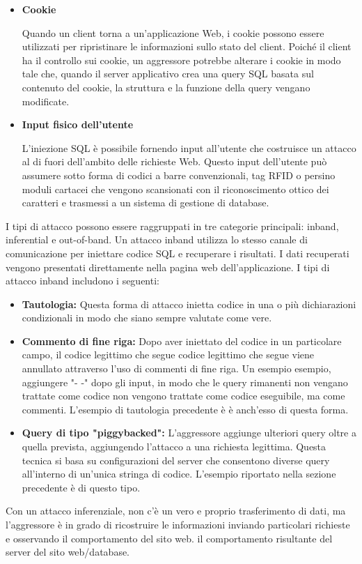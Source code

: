 \begin{itemize}
    \item \textbf{Cookie}
    
    Quando un client torna a un'applicazione Web, i cookie possono essere utilizzati per ripristinare le informazioni sullo stato del client. Poiché il client ha il controllo sui cookie, un aggressore potrebbe alterare i cookie in modo tale che, quando il server applicativo crea una query SQL basata sul contenuto del cookie, la struttura e la funzione della query vengano modificate.
    
    \item \textbf{Input fisico dell'utente}
    
    L'iniezione SQL è possibile fornendo input all'utente che costruisce un attacco al di fuori dell'ambito delle richieste Web. Questo input dell'utente può assumere sotto forma di codici a barre convenzionali, tag RFID o persino moduli cartacei che vengono scansionati con il riconoscimento ottico dei caratteri e trasmessi a un sistema di gestione di database.
\end{itemize}
I tipi di attacco possono essere raggruppati in tre categorie principali: inband, inferential e out-of-band. Un attacco inband utilizza lo stesso canale di comunicazione per iniettare codice SQL e recuperare i risultati. I dati recuperati vengono presentati direttamente nella pagina web dell'applicazione. I tipi di attacco inband includono i seguenti:
\begin{itemize}
    \item \textbf{Tautologia:} Questa forma di attacco inietta codice in una o più dichiarazioni condizionali in modo che siano sempre valutate come vere. 
    
    \item \textbf{Commento di fine riga:} Dopo aver iniettato del codice in un particolare campo, il codice legittimo che segue codice legittimo che segue viene annullato attraverso l'uso di commenti di fine riga. Un esempio esempio, aggiungere "- -" dopo gli input, in modo che le query rimanenti non vengano trattate come codice non vengono trattate come codice eseguibile, ma come commenti. L'esempio di tautologia precedente è è anch'esso di questa forma.
    
    \item \textbf{Query di tipo "piggybacked":} L'aggressore aggiunge ulteriori query oltre a quella prevista, aggiungendo l'attacco a una richiesta legittima. Questa tecnica si basa su configurazioni del server che consentono diverse query all'interno di un'unica stringa di codice. L'esempio riportato nella sezione precedente è di questo tipo.
\end{itemize}
Con un attacco inferenziale, non c'è un vero e proprio trasferimento di dati, ma l'aggressore è in grado di ricostruire le informazioni inviando particolari richieste e osservando il comportamento del sito web.
il comportamento risultante del server del sito web/database. 

